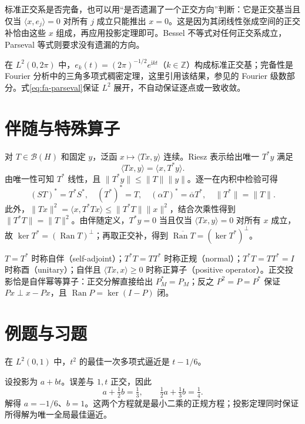标准正交系是否完备，也可以用“是否遗漏了一个正交方向”判断：它是正交基当且仅当 $\langle x,e_j\rangle=0$ 对所有 $j$ 成立只能推出 $x=0$。这是因为其闭线性张成空间的正交补恰由这些 $x$ 组成，再应用投影定理即可。Bessel 不等式对任何正交系成立，Parseval 等式则要求没有遗漏的方向。

在 $L^2(0,2\pi)$ 中，$e_k(t)=(2\pi)^{-1/2}e^{\mathrm ikt}$（$k\in\mathbb Z$）构成标准正交基；完备性是 Fourier 分析中的三角多项式稠密定理，这里引用该结果，参见\cite{teschl-ra}的 Fourier 级数部分。式\eqref{eq:fa-parseval}保证 $L^2$ 展开，不自动保证逐点或一致收敛。

\section{伴随与特殊算子}
对 $T\in\mathcal B(H)$ 和固定 $y$，泛函 $x\mapsto\langle Tx,y\rangle$ 连续。Riesz 表示给出唯一 $T^*y$ 满足
\[
 \langle Tx,y\rangle=\langle x,T^*y\rangle.
\]
由唯一性可知 $T^*$ 线性，且 $\|T^*y\|\leq\|T\|\|y\|$。逐一在内积中检验可得
\[
 (ST)^*=T^*S^*,\quad (T^*)^*=T,\quad
 (\alpha T)^*=\overline\alpha T^*,\quad\|T^*\|=\|T\|.
\]
此外，$\|Tx\|^2=\langle x,T^*Tx\rangle\leq\|T^*T\|\|x\|^2$，结合次乘性得到 $\|T^*T\|=\|T\|^2$。由伴随定义，$T^*y=0$ 当且仅当 $\langle Tx,y\rangle=0$ 对所有 $x$ 成立，故 $\ker T^*=(\operatorname{Ran}T)^\perp$；再取正交补，得到 $\overline{\operatorname{Ran}T}=(\ker T^*)^\perp$。

$T=T^*$ 时称自伴（self-adjoint）；$T^*T=TT^*$ 时称正规（normal）；$T^*T=TT^*=I$ 时称酉（unitary）；自伴且 $\langle Tx,x\rangle\geq0$ 时称正算子（positive operator）。正交投影恰是自伴幂等算子：正交分解直接给出 $P_M^*=P_M$；反之 $P^2=P=P^*$ 保证 $Px\perp x-Px$，且 $\operatorname{Ran}P=\ker(I-P)$ 闭。

\section{例题与习题}
\begin{example}[最佳一次逼近]
在 $L^2(0,1)$ 中，$t^2$ 的最佳一次多项式逼近是 $t-1/6$。
\end{example}
\begin{solve}
设投影为 $a+bt$。误差与 $1,t$ 正交，因此
\[
 a+\tfrac12b=\tfrac13,\qquad \tfrac12a+\tfrac13b=\tfrac14.
\]
解得 $a=-1/6$、$b=1$。这两个方程就是最小二乘的正规方程；投影定理同时保证所得解为唯一全局最佳逼近。
\end{solve}


